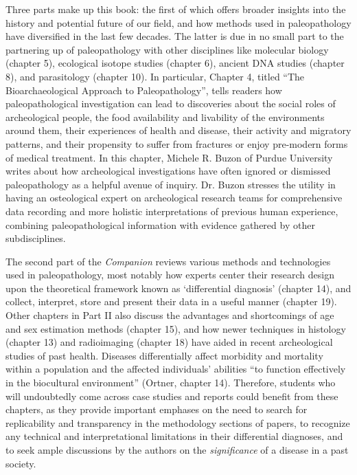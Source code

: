 \documentclass{ijsra}
\begin{document}
Three parts make up this book: the first of which offers broader insights into the history and potential future of our field, and how methods used in paleopathology have diversified in the last few decades.
The latter is due in no small part to the partnering up of paleopathology with other disciplines like molecular biology (chapter 5), ecological isotope studies (chapter 6), ancient DNA studies (chapter 8), and parasitology (chapter 10).
In particular, Chapter 4, titled “The Bioarchaeological Approach to Paleopathology”, tells readers how paleopathological investigation can lead to discoveries about the social roles of archeological people, the food availability and livability of the environments around them, their experiences of health and disease, their activity and migratory patterns, and their propensity to suffer from fractures or enjoy pre-modern forms of medical treatment.
In this chapter, Michele R. Buzon of Purdue University writes about how archeological investigations have often ignored or dismissed paleopathology as a helpful avenue of inquiry.
Dr. Buzon stresses the utility in having an osteological expert on archeological research teams for comprehensive data recording and more holistic interpretations of previous human experience, combining paleopathological information with evidence gathered by other subdisciplines.

The second part of the \textit{Companion} reviews various methods and technologies used in paleopathology, most notably how experts center their research design upon the theoretical framework known as ‘differential diagnosis’ (chapter 14), and collect, interpret, store and present their data in a useful manner (chapter 19).
Other chapters in Part II also discuss the advantages and shortcomings of age and sex estimation methods (chapter 15), and how newer techniques in histology (chapter 13) and radioimaging (chapter 18) have aided in recent archeological studies of past health. 
Diseases differentially affect morbidity and mortality within a population and the affected individuals’ abilities “to function effectively in the biocultural environment” (Ortner, chapter 14).
Therefore, students who will undoubtedly come across case studies and reports could benefit from these chapters, as they provide important emphases on the need to search for replicability and transparency in the methodology sections of papers, to recognize any technical and interpretational limitations in their differential diagnoses, and to seek ample discussions by the authors on the \textit{significance} of a disease in a past society.
\end{document}
